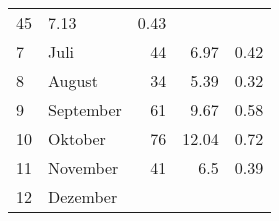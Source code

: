 \begin{longtable}{lXrrr}
       \num{45} &
       \num[round-mode=places,round-precision=2]{7,13} &
         \num[round-mode=places,round-precision=2]{0,43} \\

     7 &
     \multicolumn{1}{X}{ Juli   } &


       \num{44} &
       \num[round-mode=places,round-precision=2]{6,97} &
         \num[round-mode=places,round-precision=2]{0,42} \\

     8 &
     \multicolumn{1}{X}{ August   } &


       \num{34} &
       \num[round-mode=places,round-precision=2]{5,39} &
         \num[round-mode=places,round-precision=2]{0,32} \\

     9 &
     \multicolumn{1}{X}{ September   } &


       \num{61} &
       \num[round-mode=places,round-precision=2]{9,67} &
         \num[round-mode=places,round-precision=2]{0,58} \\

     10 &
     \multicolumn{1}{X}{ Oktober   } &


       \num{76} &
       \num[round-mode=places,round-precision=2]{12,04} &
         \num[round-mode=places,round-precision=2]{0,72} \\

     11 &
     \multicolumn{1}{X}{ November   } &


       \num{41} &
       \num[round-mode=places,round-precision=2]{6,5} &
         \num[round-mode=places,round-precision=2]{0,39} \\

     12 &
     \multicolumn{1}{X}{ Dezember   } &



\end{longtable}
